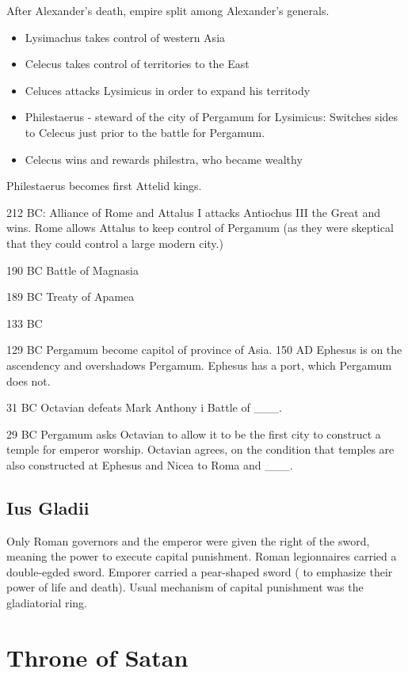 \documentclass[
]{book}
\providecommand{\tightlist}{%
  \setlength{\itemsep}{0pt}\setlength{\parskip}{0pt}}
\begin{document}
After Alexander's death, empire split among Alexander's generals.

\begin{itemize}
\tightlist
\item
  Lysimachus takes control of western Asia
\item
  Celecus takes control of territories to the East
\item
  Celuces attacks Lysimicus in order to expand his territody
\item
  Philestaerus - steward of the city of Pergamum for Lysimicus: Switches sides to Celecus just prior to the battle for Pergamum.
\item
  Celecus wins and rewards philestra, who became wealthy
\end{itemize}

Philestaerus becomes first Attelid kings.

212 BC: Alliance of Rome and Attalus I attacks Antiochus III the Great and wins. Rome allows Attalus to keep control of Pergamum (as they were skeptical that they could control a large modern city.)

190 BC Battle of Magnasia

189 BC Treaty of Apamea

133 BC

129 BC Pergamum become capitol of province of Asia. 150 AD Ephesus is on the ascendency and overshadows Pergamum. Ephesus has a port, which Pergamum does not.

31 BC Octavian defeats Mark Anthony i Battle of \_\_\_.

29 BC Pergamum asks Octavian to allow it to be the first city to construct a temple for emperor worship. Octavian agrees, on the condition that temples are also constructed at Ephesus and Nicea to Roma and \_\_\_.

\hypertarget{ius-gladii}{%
\subsection{Ius Gladii}\label{ius-gladii}}

Only Roman governors and the emperor were given the right of the sword, meaning the power to execute capital punishment. Roman legionnaires carried a double-egded sword. Emporer carried a pear-shaped sword ( to emphasize their power of life and death). Usual mechanism of capital punishment was the gladiatorial ring.

\hypertarget{throne-of-satan}{%
\section{Throne of Satan}\label{throne-of-satan}}
\end{document}

